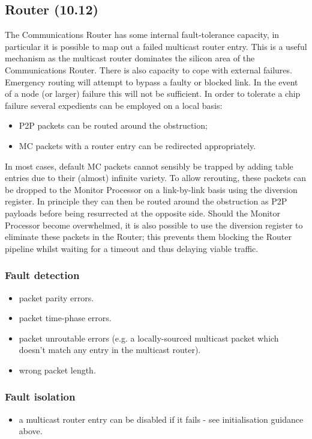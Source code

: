 \documentclass[12pt]{article}
\newenvironment{itmz}{
	\begin{itemize}
		\setlength{\itemsep}{0pt}
		\setlength{\parskip}{0pt}
	}{\end{itemize}}
\begin{document}
\subsection{Router (10.12)}
The Communications Router has some internal fault-tolerance capacity, in particular it is possible
to map out a failed multicast router entry. This is a useful mechanism as the multicast router
dominates the silicon area of the Communications Router.
There is also capacity to cope with external failures. Emergency routing will attempt to bypass a
faulty or blocked link. In the event of a node (or larger) failure this will not be sufficient. In order to
tolerate a chip failure several expedients can be employed on a local basis:
\begin{itmz}
\item P2P packets can be routed around the obstruction;
\item MC packets with a router entry can be redirected appropriately.
\end{itmz}
In most cases, default MC packets cannot sensibly be trapped by adding table entries due to their
(almost) infinite variety. To allow rerouting, these packets can be dropped to the Monitor Processor
on a link-by-link basis using the diversion register. In principle they can then be routed around the
obstruction as P2P payloads before being resurrected at the opposite side.
Should the Monitor Processor become overwhelmed, it is also possible to use the diversion register
to eliminate these packets in the Router; this prevents them blocking the Router pipeline whilst
waiting for a timeout and thus delaying viable traffic.
\subsubsection*{Fault detection}
\begin{itmz}
\item packet parity errors.
\item packet time-phase errors.
\item packet unroutable errors (e.g. a locally-sourced multicast packet which doesn’t match any entry
in the multicast router).
\item wrong packet length.
\end{itmz}
\subsubsection*{Fault isolation}
\begin{itmz}
\item a multicast router entry can be disabled if it fails - see initialisation guidance above.
\end{itmz}
\end{document}
